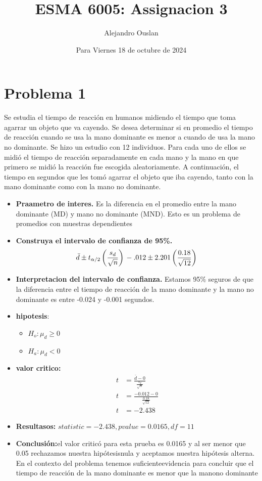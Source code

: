 \documentclass[10pt, oneside]{article}
\title{ESMA 6005: Assignacion 3}
\author{Alejandro Ouslan}
\date{Para Viernes 18 de octubre de 2024}
\begin{document}
\maketitle

\vspace{.25in}

\section{Problema 1}
Se estudia el tiempo de reacción en humanos midiendo el tiempo que toma agarrar un objeto que va cayendo.
Se desea determinar si en promedio el tiempo de reacción cuando se usa la mano dominante es menor a cuando
de usa la mano no dominante. Se hizo un estudio con 12 individuos. Para cada uno de ellos se midió el tiempo
de reacción separadamente en cada mano y la mano en que primero se midió la reacción fue escogida aleatoriamente.
A continuación, el tiempo en segundos que les tomó agarrar el objeto que iba cayendo, tanto con la mano dominante
como con la mano no dominante.

\begin{itemize}
	\item \textbf{Praametro de interes.}
	      Es la diferencia en el promedio entre la mano dominante (MD) y mano no dominante (MND).
	      Esto es un problema de promedios con muestras dependientes
	\item \textbf{Construya el intervalo de confianza de 95\%.}
	      \[
		      \bar{d} \pm t_{\alpha/2} \left( \frac{s_d}{\sqrt{n}} \right) \\
		      -.012 \pm 2.201 \left( \frac{0.18}{\sqrt{12}} \right) \\
	      \]
	\item \textbf{Interpretacion del intervalo de confianza.}
	      Estamos 95\% seguros de que la diferencia entre el tiempo de reacción de la mano dominante y la mano no dominante es
	      entre -0.024 y -0.001 segundos.

	\item \textbf{hipotesis}:
	      \begin{itemize}
		      \item  $H_o: \mu_d \geq 0$
		      \item $H_a: \mu_d < 0$
	      \end{itemize}
	\item \textbf{valor critico:}
	      \[
		      \begin{split}
			      t &= \frac{\bar{d} - 0}{\frac{s_d}{\sqrt{n}}}\\
			      t &= \frac{-0.012 - 0}{\frac{0.18}{\sqrt{12}}}\\
			      t &= -2.438
		      \end{split}
	      \]
	\item \textbf{Resultasos:}
	      $statistic=-2.438, pvalue=0.0165, df=11$
	\item \textbf{Conclusión:}el valor criticó para esta prueba es 0.0165 y al ser menor que 0.05 rechazamos nuestra hipótesisnula
	      y aceptamos nuestra hipótesis alterna. En el contexto del problema tenemos suficienteevidencia para concluir que el tiempo de
	      reacción de la mano dominante es menor que la manono dominante
\end{itemize}
\end{document}
